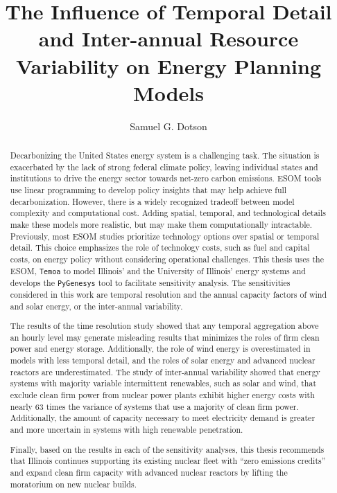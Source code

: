 \documentclass[edeposit,fullpage,11pt]{uiucthesis2018}
\title{The Influence of Temporal Detail and Inter-annual Resource Variability on
Energy Planning Models}
\author{Samuel G. Dotson}
\begin{document}
\maketitle
%
\frontmatter
\begin{abstract}

Decarbonizing the United States energy system is a challenging task. The situation
is exacerbated by the lack of strong federal climate policy, leaving individual
states and institutions to drive the energy sector towards net-zero carbon emissions.
ESOM tools use linear programming to develop policy insights that may help achieve
full decarbonization. However, there is a widely recognized tradeoff between model
complexity and computational cost. Adding spatial, temporal, and technological
details make these models more realistic, but may make them computationally
intractable. Previously, most ESOM studies prioritize technology options over
spatial or temporal detail. This choice emphasizes the role of technology costs,
such as fuel and capital costs, on energy policy without considering operational
challenges. This thesis uses the ESOM, \texttt{Temoa} to model Illinois' and
the University of Illinois' energy systems and develops the \texttt{PyGenesys}
tool to facilitate sensitivity analysis. The sensitivities considered in this work
are temporal resolution and the annual capacity factors of wind and solar energy,
or the inter-annual variability.

The results of the time resolution study showed that any temporal aggregation
above an hourly level may generate misleading results that minimizes the roles
of firm clean power and energy storage. Additionally, the role of wind energy is
overestimated in models with less temporal detail, and the roles of solar energy
and advanced nuclear reactors are underestimated. The study of inter-annual variability
showed that energy systems with majority variable intermittent renewables, such
as solar and wind, that exclude clean firm power from nuclear power plants exhibit
higher energy costs with nearly 63 times the variance of systems that use a
majority of clean firm power. Additionally, the amount of capacity necessary to meet
electricity demand is greater and more uncertain in systems with high renewable
penetration.

Finally, based on the results in each of the sensitivity analyses, this thesis
recommends that Illinois continues supporting its existing nuclear fleet with
``zero emissions credits'' and expand clean firm capacity with advanced nuclear
reactors by lifting the moratorium on new nuclear builds.


\end{abstract}
\end{document}
